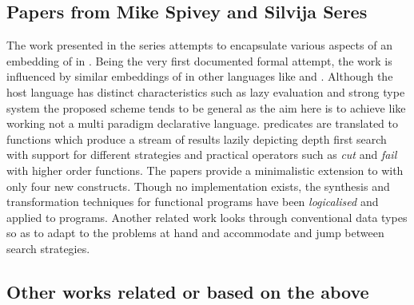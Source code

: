 \documentclass[thesis-solanki.tex]{subfiles}
\begin{document}
\subsection{Papers from Mike Spivey and Silvija Seres}


The work presented in the series
\cite{spivey1999embedding,seres1999algebra,seres2001higher,spivey1999algebra,seres2001algebra} attempts to
encapsulate various aspects of an embedding of  in .
Being the very first documented formal attempt, the work is influenced by similar embeddings of 
in other languages like  and .
Although the host language has distinct characteristics such as lazy evaluation and strong type system the proposed
scheme tends to be general as the aim here is to achieve  like working not a multi paradigm
declarative language.
 predicates are translated to  functions which produce a stream of results
lazily depicting depth first search with support for different strategies and practical operators such as
\textit{cut} and \textit{fail} with higher order functions.
The papers provide a minimalistic extension to  with only four new constructs.
Though no implementation exists, the synthesis and transformation techniques for functional programs have been
\textit{logicalised} and applied to  programs.
Another related work \cite{spivey2000functional} looks through conventional data types so as to adapt to the
problems at hand and accommodate and jump between search strategies.


\subsection{Other works related or based on the above}

\end{document}

